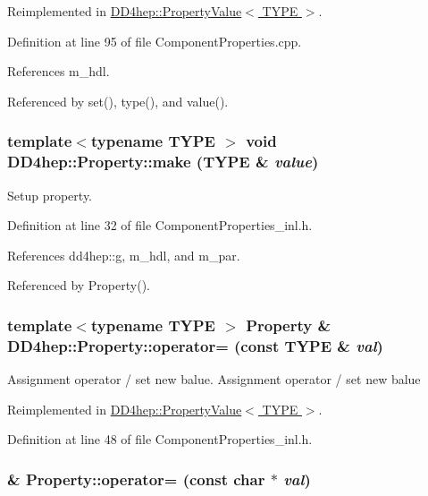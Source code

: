 Reimplemented in \hyperlink{class_d_d4hep_1_1_property_value_a38e94952fe4125eb2cd93a3b10a202d6}{DD4hep::PropertyValue$<$ TYPE $>$}.

Definition at line 95 of file ComponentProperties.cpp.

References m\_\-hdl.

Referenced by set(), type(), and value().\hypertarget{class_d_d4hep_1_1_property_a7b18fa0adeb1c0a6e7f64affefe6d782}{
\subsubsection[{make}]{\setlength{\rightskip}{0pt plus 5cm}template$<$typename TYPE $>$ void DD4hep::Property::make (TYPE \& {\em value})}}
\label{class_d_d4hep_1_1_property_a7b18fa0adeb1c0a6e7f64affefe6d782}


Setup property. 

Definition at line 32 of file ComponentProperties\_\-inl.h.

References dd4hep::g, m\_\-hdl, and m\_\-par.

Referenced by Property().\hypertarget{class_d_d4hep_1_1_property_ac47fe600ca62fcd0cfc22ae927d9271c}{
\subsubsection[{operator=}]{\setlength{\rightskip}{0pt plus 5cm}template$<$typename TYPE $>$ {\bf Property} \& DD4hep::Property::operator= (const TYPE \& {\em val})}}
\label{class_d_d4hep_1_1_property_ac47fe600ca62fcd0cfc22ae927d9271c}


Assignment operator / set new balue. Assignment operator / set new balue 

Reimplemented in \hyperlink{class_d_d4hep_1_1_property_value_acb9f4997dbe446e56717ba1d58929303}{DD4hep::PropertyValue$<$ TYPE $>$}.

Definition at line 48 of file ComponentProperties\_\-inl.h.\hypertarget{class_d_d4hep_1_1_property_a5b6de39455110bc81a239a92115d816e}{
\subsubsection[{operator=}]{ \& Property::operator= (const char $\ast$ {\em val})}}
\label{class_d_d4hep_1_1_property_a5b6de39455110bc81a239a92115d816e}



